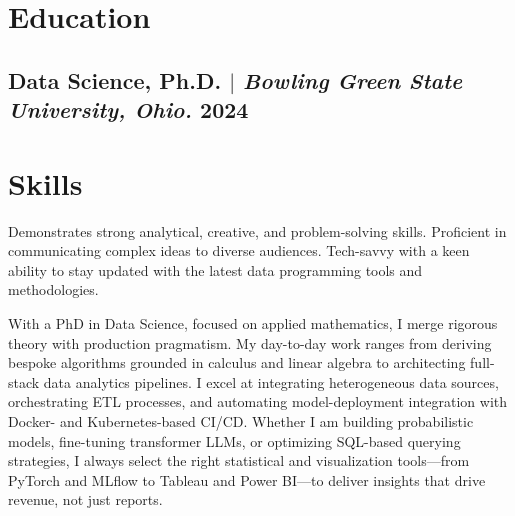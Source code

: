 \documentclass[11pt]{article} %
\begin{document}
\section{Education}
\subsection{Data Science, Ph.D. $|$ {\normalfont\itshape Bowling Green State University, Ohio. } \hfill 2024} 
\vspace{1em}

\section{Skills}
Demonstrates strong analytical, creative, and problem-solving skills. Proficient in communicating complex ideas to diverse audiences. Tech-savvy with a keen ability to stay updated with the latest data programming tools and methodologies.

With a PhD in Data Science, focused on applied mathematics, I merge rigorous theory with production pragmatism. My day-to-day work ranges from deriving bespoke algorithms grounded in calculus and linear algebra to architecting full-stack data analytics pipelines. I excel at integrating heterogeneous data sources, orchestrating ETL processes, and automating model-deployment integration with Docker- and Kubernetes-based CI/CD. Whether I am building probabilistic models, fine-tuning transformer LLMs, or optimizing SQL-based querying strategies, I always select the right statistical and visualization tools—from PyTorch and MLflow to Tableau and Power BI—to deliver insights that drive revenue, not just reports.
\end{document}
